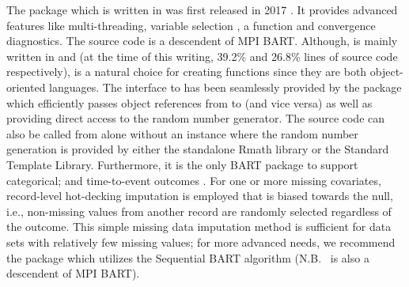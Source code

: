 \documentclass[article]{jss}
\begin{document}
The  package which is written in  was first
released in 2017 \citep{McCuSpar18}.  It provides advanced features
like multi-threading, variable selection \citep{Line16}, a
 function and convergence diagnostics.  The source code
is a descendent of MPI BART.  Although,  is mainly written
in  and  (at the time of this writing,
39.2\% and 26.8\% lines of source code respectively), 
is a natural choice for creating  functions since they are
both object-oriented languages.  The  interface to
 has been seamlessly provided by the  package
\citep{EddeFran11} which efficiently passes object references from
 to  (and vice versa) as well as providing
direct access to the  random number generator.  The
source code can also be called from  alone without an
 instance where the random number generation is provided
by either the standalone Rmath library \citep{RCor17} or the
  Standard Template Library.  Furthermore,
it is the only BART package to support categorical; and time-to-event
outcomes \citep{SparLoga16,SparRein18,SparLoga19}.  For one or more
missing covariates, record-level hot-decking imputation
\citep{deWaPann11} is employed that is biased towards the null, i.e.,
non-missing values from another record are randomly selected regardless
of the outcome.  This simple missing data imputation method is
sufficient for data sets with relatively few missing values; for more
advanced needs, we recommend the  package which utilizes
the Sequential BART algorithm \citep{DaniSing17,XuDani16} (N.B.\
 is also a descendent of MPI BART).
\end{document}
